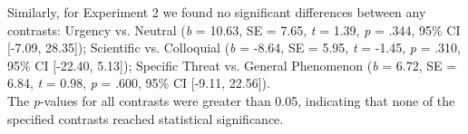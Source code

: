  Similarly, for Experiment 2 we found no significant differences between any contrasts: Urgency vs. Neutral (\textit{b} = 10.63, SE = 7.65, \textit{t }= 1.39, \textit{p} = .344, 95\% CI [-7.09, 28.35]); Scientific vs. Colloquial (\textit{b} = -8.64, SE = 5.95, \textit{t} = -1.45, \textit{p} = .310, 95\% CI [-22.40, 5.13]); Specific Threat vs. General Phenomenon (\textit{b} = 6.72, SE = 6.84, \textit{t} = 0.98, \textit{p} = .600, 95\% CI [-9.11, 22.56]). \\

 The \textit{p}-values for all contrasts were greater than 0.05, indicating that none of the specified contrasts reached statistical significance. 

